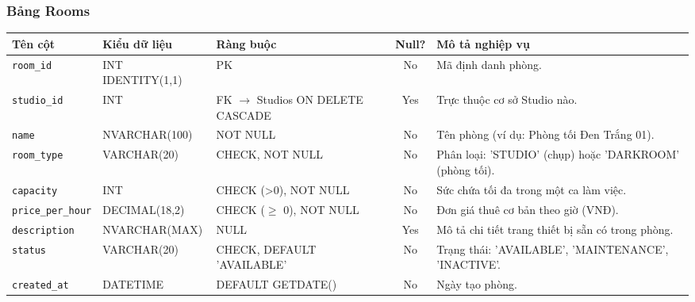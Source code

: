 \subsubsection{Bảng Rooms}
\begin{table}[H]
\centering
\small
\begin{tabularx}{\textwidth}{l l l c X}
\toprule
\textbf{Tên cột} & \textbf{Kiểu dữ liệu} & \textbf{Ràng buộc} & \textbf{Null?} & \textbf{Mô tả nghiệp vụ} \\
\midrule
\texttt{room\_id} & INT IDENTITY(1,1) & PK & No & Mã định danh phòng. \\
\texttt{studio\_id} & INT & FK $\rightarrow$ Studios ON DELETE CASCADE & Yes & Trực thuộc cơ sở Studio nào. \\
\texttt{name} & NVARCHAR(100) & NOT NULL & No & Tên phòng (ví dụ: Phòng tối Đen Trắng 01). \\
\texttt{room\_type} & VARCHAR(20) & CHECK, NOT NULL & No & Phân loại: 'STUDIO' (chụp) hoặc 'DARKROOM' (phòng tối). \\
\texttt{capacity} & INT & CHECK (>0), NOT NULL & No & Sức chứa tối đa trong một ca làm việc. \\
\texttt{price\_per\_hour} & DECIMAL(18,2) & CHECK ($\ge$ 0), NOT NULL & No & Đơn giá thuê cơ bản theo giờ (VNĐ). \\
\texttt{description} & NVARCHAR(MAX) & NULL & Yes & Mô tả chi tiết trang thiết bị sẵn có trong phòng. \\
\texttt{status} & VARCHAR(20) & CHECK, DEFAULT 'AVAILABLE' & No & Trạng thái: 'AVAILABLE', 'MAINTENANCE', 'INACTIVE'. \\
\texttt{created\_at} & DATETIME & DEFAULT GETDATE() & No & Ngày tạo phòng. \\
\bottomrule
\end{tabularx}
\end{table}

